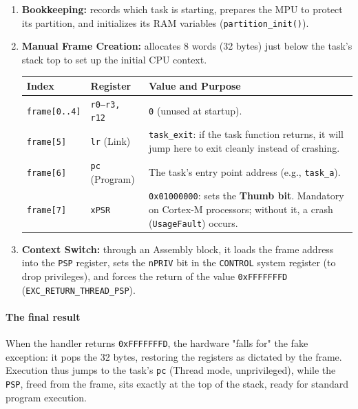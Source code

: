 \begin{enumerate}
    \item \textbf{Bookkeeping:} records which task is starting, prepares the MPU to protect its partition, and initializes its RAM variables (\texttt{partition\_init()}).
    
    \item \textbf{Manual Frame Creation:} allocates 8 words (32 bytes) just below the task's stack top to set up the initial CPU context.

    \begin{center}
    \begin{tabular}{|l|l|p{8cm}|}
    \hline
    \textbf{Index} & \textbf{Register} & \textbf{Value and Purpose} \\
    \hline
    \texttt{frame[0..4]} & \texttt{r0--r3, r12} & \texttt{0} (unused at startup). \\
    \hline
    \texttt{frame[5]} & \texttt{lr} (Link) & \texttt{task\_exit}: if the task function returns, it will jump here to exit cleanly instead of crashing. \\
    \hline
    \texttt{frame[6]} & \texttt{pc} (Program) & The task's entry point address (e.g., \texttt{task\_a}). \\
    \hline
    \texttt{frame[7]} & \texttt{xPSR} & \texttt{0x01000000}: sets the \textbf{Thumb bit}. Mandatory on Cortex-M processors; without it, a crash (\texttt{UsageFault}) occurs. \\
    \hline
    \end{tabular}
    \end{center}

    \item \textbf{Context Switch:} through an Assembly block, it loads the frame address into the \texttt{PSP} register, sets the \texttt{nPRIV} bit in the \texttt{CONTROL} system register (to drop privileges), and forces the return of the value \texttt{0xFFFFFFFD} (\texttt{EXC\_RETURN\_THREAD\_PSP}).
\end{enumerate}

\paragraph*{The final result}
When the handler returns \texttt{0xFFFFFFFD}, the hardware "falls for" the fake exception: it pops the 32 bytes, restoring the registers as dictated by the frame. Execution thus jumps to the task's \texttt{pc} (Thread mode, unprivileged), while the \texttt{PSP}, freed from the frame, sits exactly at the top of the stack, ready for standard program execution.

